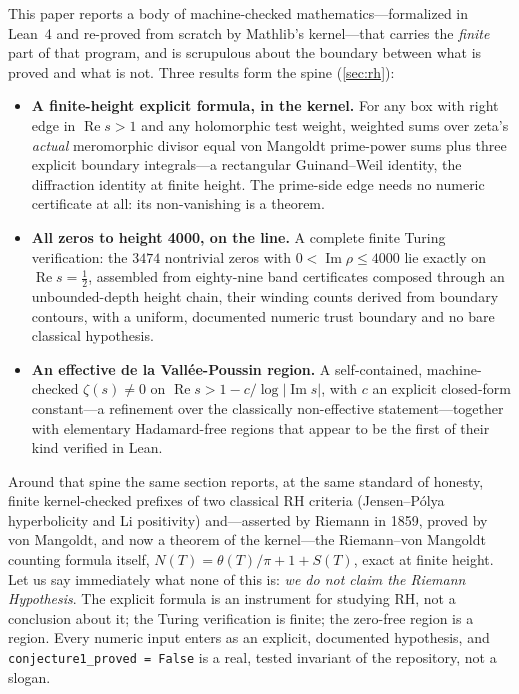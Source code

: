 This paper reports a body of machine-checked mathematics---formalized in
Lean~4 and re-proved from scratch by Mathlib's kernel---that carries the
\emph{finite} part of that program, and is scrupulous about the boundary
between what is proved and what is not. Three results form the spine
(\cref{sec:rh}):
\begin{itemize}
  \item \textbf{A finite-height explicit formula, in the kernel.} For any box
    with right edge in $\operatorname{Re} s > 1$ and any holomorphic test
    weight, weighted sums over zeta's \emph{actual} meromorphic divisor equal
    von Mangoldt prime-power sums plus three explicit boundary integrals---a
    rectangular Guinand--Weil identity, the diffraction identity at finite
    height. The prime-side edge needs no numeric certificate at all: its
    non-vanishing is a theorem.
  \item \textbf{All zeros to height 4000, on the line.} A complete finite
    Turing verification: the $3474$ nontrivial zeros with
    $0 < \operatorname{Im}\rho \le 4000$ lie exactly on
    $\operatorname{Re} s = \tfrac12$, assembled from eighty-nine band
    certificates composed through an unbounded-depth height chain, their
    winding counts derived from boundary contours, with
    a uniform, documented numeric trust boundary and no bare classical
    hypothesis.
  \item \textbf{An effective de la Vallée-Poussin region.} A self-contained,
    machine-checked $\zeta(s) \ne 0$ on
    $\operatorname{Re} s > 1 - c/\log|\operatorname{Im} s|$, with $c$ an
    explicit closed-form constant---a refinement over the classically
    non-effective statement---together with elementary Hadamard-free regions
    that appear to be the first of their kind verified in Lean.
\end{itemize}
Around that spine the same section reports, at the same standard of honesty,
finite kernel-checked prefixes of two classical RH criteria (Jensen--P\'olya
hyperbolicity and Li positivity) and---asserted by Riemann in 1859, proved by
von Mangoldt, and now a theorem of the kernel---the Riemann--von Mangoldt
counting formula itself, $N(T) = \theta(T)/\pi + 1 + S(T)$, exact at finite
height.
Let us say immediately what none of this is: \emph{we do not claim the Riemann
Hypothesis}. The explicit formula is an instrument for studying RH, not a
conclusion about it; the Turing verification is finite; the zero-free region is
a region. Every numeric input enters as an explicit, documented hypothesis, and
\texttt{conjecture1\_proved = False} is a real, tested invariant of the
repository, not a slogan.


